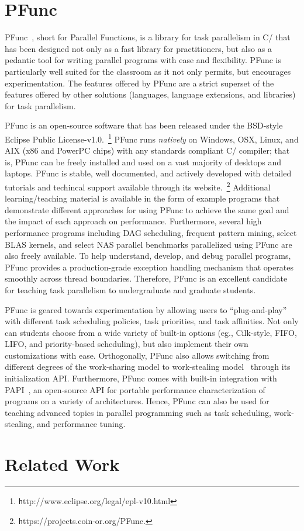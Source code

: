 \documentclass[9pt,twocolumn,letter]{article}
\begin{document}
\section{PFunc}
\label{sec:pfunc}
PFunc~\cite{kambadur09:pfunc}, short for Parallel Functions, is a library for
task parallelism in C/\Cpp{} that has been designed not only as a fast library
for practitioners, but also as a pedantic tool for writing parallel programs
with ease and flexibility.
%
PFunc is particularly well suited for the classroom as it not only permits, but
encourages experimentation.
%
The features offered by PFunc are a strict superset of the features offered by
other solutions (languages, language extensions, and libraries) for task
parallelism.

%
%
PFunc is an open-source software that has been released under the BSD-style
Eclipse Public License-v1.0.~\footnote{\texttt
http://www.eclipse.org/legal/epl-v10.html}
%
PFunc runs \textit{natively} on Windows, OSX, Linux, and AIX (x86 and
PowerPC chips) with any standards compliant C/\Cpp{} compiler; that is, PFunc
can be freely installed and used on a vast majority of desktops and
laptops.
%
PFunc is stable, well documented, and actively developed with detailed
tutorials and techincal support available through its
website.~\footnote{\texttt https://projects.coin-or.org/PFunc.}
%
Additional learning/teaching material is available in the form of example
programs that demonstrate different approaches for using PFunc to achieve the
same goal and the impact of each approach on performance.
%
Furthermore, several high performance programs including DAG scheduling,
frequent pattern mining, select BLAS kernels, and select NAS parallel
benchmarks parallelized using PFunc are also freely available.
%
To help understand, develop, and debug parallel programs, PFunc provides a
production-grade exception handling mechanism that operates smoothly across
thread boundaries.
%
Therefore, PFunc is an excellent candidate for teaching task parallelism to 
undergraduate and graduate students.

%
%
PFunc is geared towards experimentation by allowing users to ``plug-and-play''
with different task scheduling policies, task priorities, and task affinities.
%
Not only can students choose from a wide variety of built-in options (eg.,
Cilk-style, FIFO, LIFO, and priority-based scheduling), but also implement
their own customizations with ease.
%
Orthogonally, PFunc also allows switching from different degrees of the
work-sharing model to work-stealing model~\cite{Blumofe94} through its
initialization API.
%
Furthermore, PFunc comes with built-in integration with PAPI~\cite{papi}, an
open-source API for portable performance characterization of programs on a
variety of architectures. 
%
Hence, PFunc can also be used for teaching advanced topics in parallel
programming such as task scheduling, work-stealing, and performance tuning. 

%
%
\section{Related Work}

\tiny


\end{document}
